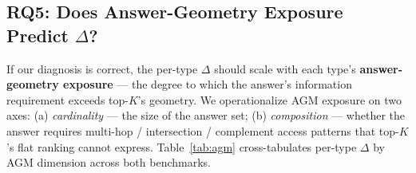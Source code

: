 \documentclass[11pt,a4paper]{article}
\begin{document}
\subsection{RQ5: Does Answer-Geometry Exposure Predict \texorpdfstring{$\Delta$}{Delta}?}
\label{sec:rq5}

If our diagnosis is correct, the per-type $\Delta$ should scale with each type's \textbf{answer-geometry exposure} --- the degree to which the answer's information requirement exceeds top-$K$'s geometry. We operationalize AGM exposure on two axes: (a) \emph{cardinality} --- the size of the answer set; (b) \emph{composition} --- whether the answer requires multi-hop / intersection / complement access patterns that top-$K$'s flat ranking cannot express. Table~\ref{tab:agm} cross-tabulates per-type $\Delta$ by AGM dimension across both benchmarks.
\end{document}
